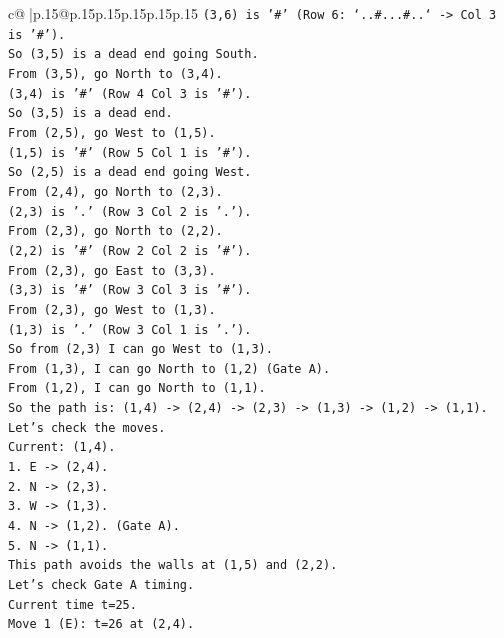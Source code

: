 \documentclass{article}
\begin{document}
{\begin{supertabular}{c@{$\;$}|p{.15\linewidth}@{}p{.15\linewidth}p{.15\linewidth}p{.15\linewidth}p{.15\linewidth}p{.15\linewidth}}
{{{\texttt{(3,6) is '\#' (Row 6: `..\#...\#..` {-}> Col 3 is '\#').} \\
\texttt{So (3,5) is a dead end going South.} \\
\texttt{From (3,5), go North to (3,4).} \\
\texttt{(3,4) is '\#' (Row 4 Col 3 is '\#').} \\
\texttt{So (3,5) is a dead end.} \\
\texttt{From (2,5), go West to (1,5).} \\
\texttt{(1,5) is '\#' (Row 5 Col 1 is '\#').} \\
\texttt{So (2,5) is a dead end going West.} \\
\texttt{From (2,4), go North to (2,3).} \\
\texttt{(2,3) is '.' (Row 3 Col 2 is '.').} \\
\texttt{From (2,3), go North to (2,2).} \\
\texttt{(2,2) is '\#' (Row 2 Col 2 is '\#').} \\
\texttt{From (2,3), go East to (3,3).} \\
\texttt{(3,3) is '\#' (Row 3 Col 3 is '\#').} \\
\texttt{From (2,3), go West to (1,3).} \\
\texttt{(1,3) is '.' (Row 3 Col 1 is '.').} \\
\texttt{So from (2,3) I can go West to (1,3).} \\
\texttt{From (1,3), I can go North to (1,2) (Gate A).} \\
\texttt{From (1,2), I can go North to (1,1).} \\
\texttt{So the path is: (1,4) {-}> (2,4) {-}> (2,3) {-}> (1,3) {-}> (1,2) {-}> (1,1).} \\
\texttt{Let's check the moves.} \\
\texttt{Current: (1,4).} \\
\texttt{1. E {-}> (2,4).} \\
\texttt{2. N {-}> (2,3).} \\
\texttt{3. W {-}> (1,3).} \\
\texttt{4. N {-}> (1,2). (Gate A).} \\
\texttt{5. N {-}> (1,1).} \\
\texttt{This path avoids the walls at (1,5) and (2,2).} \\
\texttt{Let's check Gate A timing.} \\
\texttt{Current time t=25.} \\
\texttt{Move 1 (E): t=26 at (2,4).} \\
}}}
\end{supertabular}}
\end{document}
